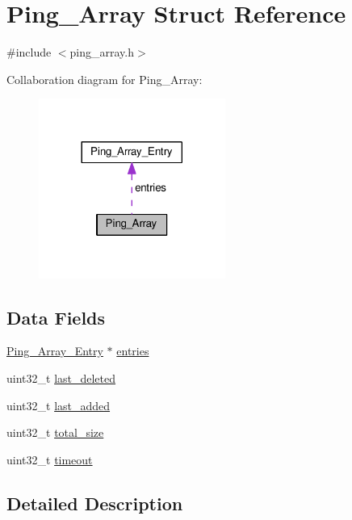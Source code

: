 \hypertarget{struct_ping___array}{\section{Ping\+\_\+\+Array Struct Reference}
\label{struct_ping___array}
}


{\ttfamily \#include $<$ping\+\_\+array.\+h$>$}



Collaboration diagram for Ping\+\_\+\+Array\+:
\nopagebreak
\begin{figure}[H]
\begin{center}
\leavevmode
\includegraphics[width=173pt]{d6/dfd/struct_ping___array__coll__graph}
\end{center}
\end{figure}
\subsection*{Data Fields}
\begin{DoxyCompactItemize}
\item 
\hyperlink{struct_ping___array___entry}{Ping\+\_\+\+Array\+\_\+\+Entry} $\ast$ \hyperlink{struct_ping___array_a313b705ae8f0db8c02b2847b315ca1b1}{entries}
\item 
uint32\+\_\+t \hyperlink{struct_ping___array_ab3011676335a878a2c94492a37a63c3f}{last\+\_\+deleted}
\item 
uint32\+\_\+t \hyperlink{struct_ping___array_a812ff28187c193e9a813628c36257df8}{last\+\_\+added}
\item 
uint32\+\_\+t \hyperlink{struct_ping___array_acdfd526bb392e1ee59a3c6c545891b48}{total\+\_\+size}
\item 
uint32\+\_\+t \hyperlink{struct_ping___array_ab5627d8d8b095c198e2523c44ca380ac}{timeout}
\end{DoxyCompactItemize}


\subsection{Detailed Description}


